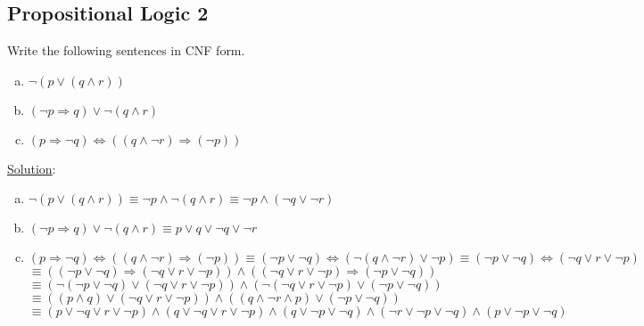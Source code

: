 \documentclass[11pt, answers]{exam}
\begin{document}
%
%
\begin{questions}
\section{Propositional Logic 2}
\question

Write the following sentences in CNF form.

\begin{enumerate}[a.]
\item $\neg (p \vee (q \wedge r))$
\item $(\neg p \Rightarrow q) \vee \neg (q \wedge r)$
\item $(p \Rightarrow \neg q) \Leftrightarrow ((q \wedge \neg r) \Rightarrow (\neg p))$
\end{enumerate}

\underline{Solution}:
\begin{enumerate}[a.]
	\item $\neg (p \vee (q \wedge r)) \equiv \neg p \wedge \neg(q \wedge r) \equiv \neg p \wedge (\neg q \vee \neg r)$
	\item $(\neg p \Rightarrow q) \vee \neg (q \wedge r) \equiv p \vee q \vee \neg q \vee \neg r$
	\item $(p \Rightarrow \neg q) \Leftrightarrow ((q \wedge \neg r) \Rightarrow (\neg p)) \equiv (\neg p \vee \neg q) \Leftrightarrow (\neg (q \wedge \neg r) \vee \neg p) \equiv (\neg p \vee \neg q) \Leftrightarrow (\neg q \vee r \vee \neg p)$ \\
	$\equiv ((\neg p \vee \neg q) \Rightarrow (\neg q \vee r \vee \neg p)) \wedge ( (\neg q \vee r \vee \neg p) \Rightarrow (\neg p \vee \neg q))$\\ 
	$\equiv (\neg(\neg p \vee \neg q) \vee (\neg q \vee r \vee \neg p)) \wedge (\neg (\neg q \vee r \vee \neg p) \vee (\neg p \vee \neg q))$\\ 
	$\equiv ((p \wedge q)\vee (\neg q \vee r \vee \neg p)) \wedge ((q\wedge \neg r \wedge p) \vee (\neg p \vee \neg q))$ \\
	$\equiv  (p\vee \neg q \vee r \vee \neg p) \wedge (q\vee \neg q \vee r \vee \neg p) \wedge  (q \vee \neg p \vee \neg q) \wedge (\neg r \vee \neg p \vee \neg q) \wedge (p \vee \neg p \vee \neg q)$
\end{enumerate}

\end{questions}
\end{document}
